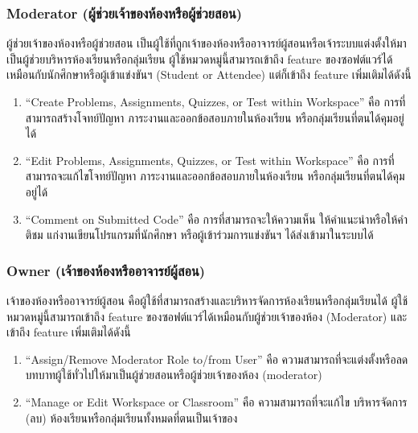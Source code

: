 \documentclass[12pt,oneside,openright,a4paper]{cpe-thai-project}
\begin{document}
        \subsubsection{Moderator (ผู้ช่วยเจ้าของห้องหรือผู้ช่วยสอน)}
        ผู้ช่วยเจ้าของห้องหรือผู้ช่วยสอน เป็นผู้ใช้ที่ถูกเจ้าของห้องหรืออาจารย์ผู้สอนหรือเจ้าระบบแต่งตั้งให้มาเป็นผู้ช่วยบริหารห้องเรียนหรือกลุ่มเรียน ผู้ใช้หมวดหมู่นี้สามารถเข้าถึง feature ของซอฟต์แวร์ได้เหมือนกับนักศึกษาหรือผู้เข้าแข่งขันฯ (Student or Attendee) แต่ก็เข้าถึง feature เพิ่มเติมได้ดังนี้
        \begin{enumerate}
            \item “Create Problems, Assignments, Quizzes, or Test within Workspace” คือ การที่สามารถสร้างโจทย์ปัญหา ภาระงานและออกข้อสอบภายในห้องเรียน หรือกลุ่มเรียนที่ตนได้คุมอยู่ได้
            \item “Edit Problems, Assignments, Quizzes, or Test within Workspace” คือ การที่สามารถจะแก้ไขโจทย์ปัญหา ภาระงานและออกข้อสอบภายในห้องเรียน หรือกลุ่มเรียนที่ตนได้คุมอยู่ได้
            \item “Comment on Submitted Code” คือ การที่สามารถจะให้ความเห็น ให้คำแนะนำหรือให้คำติชม แก่งานเขียนโปรแกรมที่นักศึกษา หรือผู้เข้าร่วมการแข่งขันฯ ได้ส่งเข้ามาในระบบได้
        \end{enumerate}
        
        \subsubsection{Owner (เจ้าของห้องหรืออาจารย์ผู้สอน)}
        เจ้าของห้องหรืออาจารย์ผู้สอน คือผู้ใช้ที่สามารถสร้างและบริหารจัดการห้องเรียนหรือกลุ่มเรียนได้ ผู้ใช้หมวดหมู่นี้สามารถเข้าถึง feature ของซอฟต์แวร์ได้เหมือนกับผู้ช่วยเจ้าของห้อง (Moderator) และเข้าถึง feature เพิ่มเติมได้ดังนี้
        \begin{enumerate}
            \item “Assign/Remove Moderator Role to/from User” คือ ความสามารถที่จะแต่งตั้งหรือลดบทบาทผู้ใช้ทั่วไปให้มาเป็นผู้ช่วยสอนหรือผู้ช่วยเจ้าของห้อง (moderator)
            \item “Manage or Edit Workspace or Classroom” คือ ความสามารถที่จะแก้ไข บริหารจัดการ (ลบ) ห้องเรียนหรือกลุ่มเรียนทั้งหมดที่ตนเป็นเจ้าของ
        \end{enumerate}
        
\end{document}
